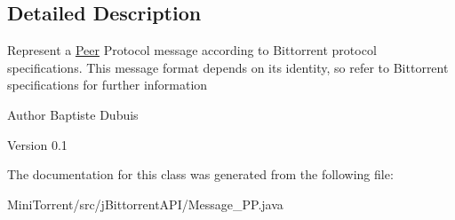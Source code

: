 \subsection{Detailed Description}
Represent a \hyperlink{classj_bittorrent_a_p_i_1_1_peer}{Peer} Protocol message according to Bittorrent protocol specifications. This message format depends on its identity, so refer to Bittorrent specifications for further information

\begin{DoxyAuthor}{Author}
Baptiste Dubuis 
\end{DoxyAuthor}
\begin{DoxyVersion}{Version}
0.1 
\end{DoxyVersion}


The documentation for this class was generated from the following file:\begin{DoxyCompactItemize}
\item 
MiniTorrent/src/jBittorrentAPI/Message\_\-PP.java\end{DoxyCompactItemize}
